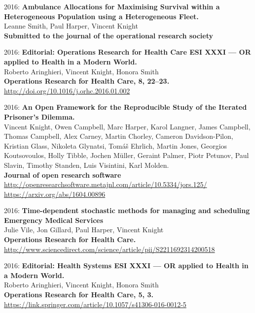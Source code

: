 \documentclass[10pt]{res} %
\begin{document}
\begin{resume}
\begin{etaremune}
\item
2016: \textbf{Ambulance Allocations for Maximising Survival within a Heterogeneous Population using a Heterogeneous Fleet.}\\
Leanne Smith, Paul Harper, Vincent Knight
\\
\textbf{Submitted to the journal of the operational research society}
\\

\item
2016: \textbf{Editorial: Operations Research for Health Care ESI XXXI — OR applied to Health in a Modern World.}\\
Roberto Aringhieri, Vincent Knight, Honora Smith
\\
\textbf{Operations Research for Health Care, 8, 22–23.}
\\
\url{http://doi.org/10.1016/j.orhc.2016.01.002}
\\

\item
2016: \textbf{An Open Framework for the Reproducible Study of the Iterated Prisoner’s Dilemma.}\\
Vincent Knight, Owen Campbell, Marc Harper, Karol Langner, James Campbell, Thomas Campbell, Alex Carney, Martin Chorley, Cameron Davidson-Pilon, Kristian Glass, Nikoleta Glynatsi, Tomáš Ehrlich, Martin Jones, Georgios Koutsovoulos, Holly Tibble, Jochen Müller, Geraint Palmer, Piotr Petunov, Paul Slavin, Timothy Standen, Luis Visintini, Karl Molden.
\\
\textbf{Journal of open research software}
\\
\url{http://openresearchsoftware.metajnl.com/article/10.5334/jors.125/}
\\
\url{https://arxiv.org/abs/1604.00896}
\\

\item
2016: \textbf{Time-dependent stochastic methods for managing and scheduling Emergency Medical Services}\\
Julie Vile, Jon Gillard, Paul Harper, Vincent Knight
\\
\textbf{Operations Research for Health Care.}
\\
\url{http://www.sciencedirect.com/science/article/pii/S2211692314200518}
\\

\item
2016: \textbf{Editorial: Health Systems ESI XXXI — OR applied to Health in a Modern World.}\\
Roberto Aringhieri, Vincent Knight, Honora Smith
\\
\textbf{Operations Research for Health Care, 5, 3.}
\\
\url{https://link.springer.com/article/10.1057/s41306-016-0012-5}
\\


\end{etaremune}
\end{resume}
\end{document}
